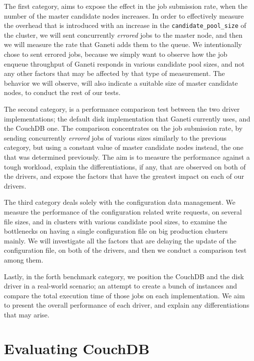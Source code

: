 The first category, aims to expose the effect in the job submission rate, when
the number of the master candidate nodes increases. In
order to effectively measure the overhead that is introduced with an increase in
the \texttt{candidate\_pool\_size} of the cluster, we will sent concurrently
\emph{errored} jobs to the master node, and then we will measure the rate that
Ganeti adds them to the queue. We intentionally chose to sent errored jobs,
because we simply want to observe how the job enqueue throughput of Ganeti
responds in various candidate pool sizes, and not any other factors that may be
affected by that type of measurement. The behavior we will observe, will also
indicate a suitable size of master candidate nodes, to conduct the rest of our
tests.

The second category, is a performance comparison test between the two driver
implementations; the default disk implementation that Ganeti currently uses, and
the CouchDB one. The comparison concentrates on the job submission rate, by
sending concurrently \emph{errored} jobs of various sizes similarly to the
previous category, but using a constant value of master candidate nodes instead,
the one that was determined previously. The aim is to measure the performance
against a tough workload, explain the differentiations, if any, that are
observed on both of the drivers, and expose the factors that have the greatest
impact on each of our drivers.

The third category deals solely with the configuration data management. We
measure the performance of the configuration related write requests, on several
file sizes, and in clusters with various candidate pool sizes, to examine the
bottlenecks on having a single configuration file on big production clusters
mainly. We will investigate all the factors that are delaying the update of the
configuration file, on both of the drivers, and then we conduct a comparison
test among them.

Lastly, in the forth benchmark category, we position the CouchDB and the disk
driver in a real-world scenario; an attempt to create a bunch of instances and
compare the total execution time of those jobs on each implementation. We aim to
present the overall performance of each driver, and explain any differentiations
that may arise.

\section{Evaluating CouchDB}\label{sec:perfom_couch}

